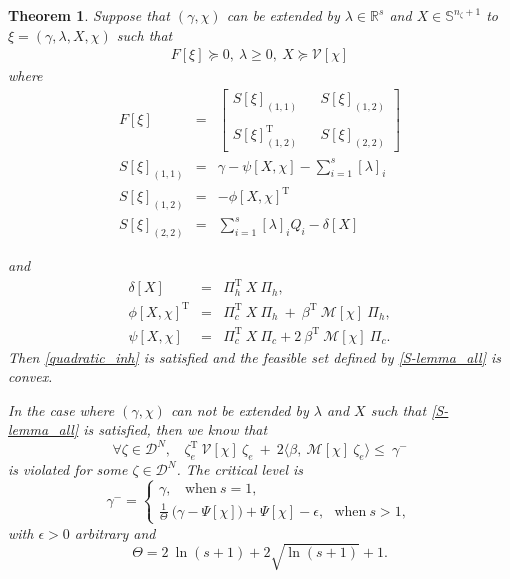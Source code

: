 \documentclass[letterpaper,11pt]{article}
\newcommand{\AR}[2]{\left[\begin{array}{#1}#2\end{array}\right]}
\newcommand{\T}{\mathrm{T}}
\newtheorem{theorem}{Theorem}
\begin{document}
\begin{theorem} 
	\label{Theorem 1}
    Suppose that $ ( \gamma, \chi) $ can 
	be extended by $  \lambda \in \mathbb{R}^s$ and $ X \in \mathbb{S}^{n_{\zeta}+1}$ 
	to $ \xi = (\gamma, \lambda,  X, \chi)$
	such that 	
	\begin{eqnarray}
	\label{S-lemma_all}	
	F[\xi] \succeq  0, ~ \lambda  \geq 0, ~ X  \succeq  \mathcal{V}[ \chi] 
	\end{eqnarray}
	where	
	\begin{eqnarray}
	\label{S-lemma_parameters}	
	\nonumber
	F[\xi] & = & \AR{ccc}{ S[\xi ]_{(1,1)} &  & 
		S[ \xi]_{(1,2)} \\ 
		&  &\\
		\nonumber
		S[\xi]_{(1,2)}^{\T} 	&  & S[\xi]_{(2,2)} } \\
	\nonumber
	S[\xi]_{(1,1)} & = & 
	\gamma -  \psi[X,  \chi ]  - \sum_{i=1}^{s}    [\lambda]_i \\
	\nonumber
	S[ \xi]_{(1,2)} & = & 
	-  \phi[X, \chi]^{\T} \\
	S[\xi]_{(2,2)}  & = & 
	\sum_{i=1}^{s}   [ \lambda]_i   Q_{i}  - \delta[X] 
	\end{eqnarray}	
	
	and
	\begin{eqnarray}
	\nonumber
	\delta[ X] & = & \Pi_h^\T  ~  X ~ \Pi_h ,\\
	\nonumber
	\phi[  X,\chi]^{\T}  & = & \Pi_c^\T ~   X ~ \Pi_h ~+ ~
	\beta^\T ~\mathcal{M}[ \chi] ~  \Pi_h , \\
	\psi[  X,\chi] & = & \Pi_c^\T ~  X ~ \Pi_c + 2 ~  \beta^\T  ~ \mathcal{M}[ \chi] ~  \Pi_c.
	\label{coefficients_new}
	\end{eqnarray}
	Then \eqref{quadratic_inh} is satisfied and
	the feasible set defined by 
	\eqref{S-lemma_all} is convex. 
	
	In the case where  $ ( \gamma, \chi) $ 
	can not  be extended by $  \lambda $ and $ X$ such that \eqref{S-lemma_all} is satisfied, then we know that  
	$$
	\forall    \zeta \in \mathscr{D}^N,~~~~
	\zeta_e^{\T} ~ \mathcal{V}[\chi]  ~ \zeta_e ~+~ 2 \langle \beta,  ~ 
	\mathcal{M}[ \chi]~  \zeta_e \rangle \leq~ \gamma^-
	$$
	is violated for some $  \zeta \in \mathscr{D}^N$. 
	The critical level is 
	$$
	\gamma^- = 
	\begin{cases}
	\gamma,~~~~\text{when}~ s= 1,\\
	\frac{1}{\Theta}  ~\bigg( \gamma -   \Psi[ \chi] \bigg) + 
	\Psi[ \chi] -\epsilon, ~~~\text{when}~ s > 1,
	\end{cases}
	$$
	with $ \epsilon > 0 $ arbitrary and
	$$
	\Theta = 2 ~ \ln(s+1) + 2 \sqrt{\ln(s+1)} +1.
	$$
\end{theorem}
\end{document}
